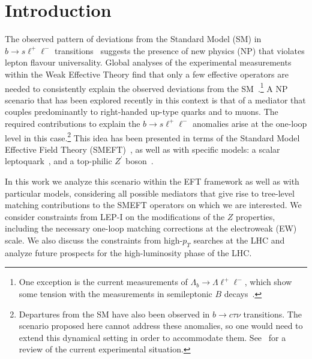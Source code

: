 \documentclass[aps,twocolumn,showpacs,preprintnumbers,amsmath,amssymb,floatfix,nofootinbib]{revtex4-1}
\begin{document}
\maketitle

%

\section{Introduction}




The observed pattern of deviations from the Standard Model (SM) in $b \to s \ell^+ \ell^-$ transitions~\cite{LHCb:2014vgu,LHCb:2017avl,LHCb:2013ghj,LHCb:2015svh,Belle:2016fev} suggests the presence of new physics (NP) that violates lepton flavour universality.     Global analyses of the experimental measurements within the Weak Effective Theory find that only a few effective operators are needed to consistently explain  the observed deviations from the SM~\cite{Capdevila:2017bsm,Altmannshofer:2017yso,Geng:2017svp,Ciuchini:2017mik,DAmico:2017mtc,Hiller:2017bzc}.\footnote{One exception is the current measurements of $\Lambda_b \to \Lambda \ell^+ \ell^-$, which show some tension with the measurements in semileptonic $B$ decays~\cite{Meinel:2016grj}.}        A NP scenario that has been explored recently in this context is that of a mediator that couples predominantly to right-handed up-type quarks and to muons.   The required contributions to explain the $b \to s \ell^+ \ell^-$ anomalies arise at the one-loop level in this case.\footnote{Departures from the SM have also been observed in $b \to c \tau \nu$ transitions.  The scenario proposed here cannot address these anomalies, so one would need to extend this dynamical setting in order to accommodate them.  See~\cite{Ciezarek:2017yzh} for a review of the current experimental situation.  }  
   This idea has been presented in terms of the Standard Model Effective Field Theory (SMEFT)~\cite{Celis:2017doq}, as well as with specific models: a scalar leptoquark~\cite{Becirevic:2017jtw}, and a top-philic $Z^{\prime}$ boson~\cite{Kamenik:201tnu,Fox:2018ldq,}. 





In this work we analyze this scenario within the EFT framework as well as with particular models, considering all possible mediators that give rise to tree-level matching contributions to the SMEFT operators on which we are interested.    We consider constraints from LEP-I on the modifications of the $Z$ properties, including the necessary one-loop matching corrections at the electroweak (EW) scale.    We also discuss the constraints from high-$p_T$ searches at the LHC and analyze future prospects for the high-luminosity phase of the LHC.
\end{document}

